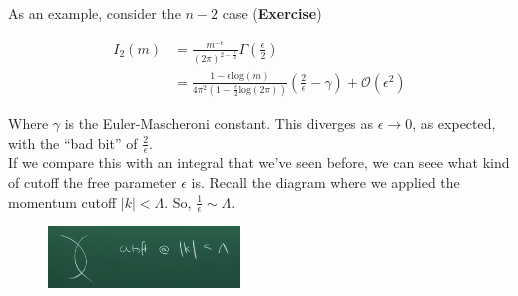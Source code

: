 \noindent As an example, consider the $n-2$ case (\textbf{Exercise})

\begin{align}
I_2 (m) &= \frac{m^{-\epsilon}}{(2\pi)^{2-\frac{\epsilon}{2}}} \Gamma \left(\frac{\epsilon}{2} \right) \\
&= \frac{1-\epsilon \text{log}(m)}{4\pi^2(1-\frac{\epsilon}{2} \text{log}(2\pi))} \left(\frac{2}{\epsilon} - \gamma \right) + \mathcal{O} (\epsilon^2)
\end{align}

\noindent Where $\gamma$ is the Euler-Mascheroni constant. This diverges as $\epsilon \rightarrow 0$, as expected, with the ``bad bit'' of $\frac{2}{\epsilon}$. \\

\noindent If we compare this with an integral that we've seen before, we can seee what kind of cutoff the free parameter $\epsilon$ is. Recall the diagram where we applied the momentum cutoff $|k| < \Lambda$. So, $\frac{1}{\epsilon} \sim \Lambda$.

\begin{figure}[H]
	\centering
	\includegraphics[width=2in]{images/firstcutoff.png}
\end{figure}
